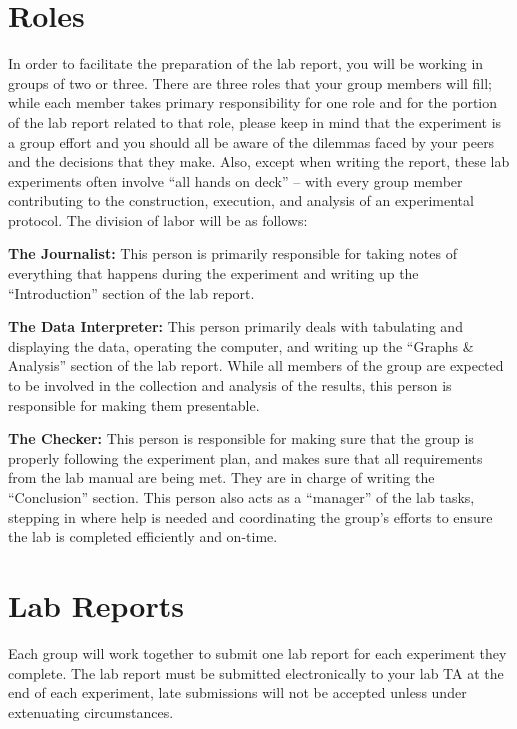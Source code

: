 \section*{Roles}
In order to facilitate the preparation of the lab report, you will be working in groups of two or three.  There are three roles that your group members will fill; while each member takes primary responsibility for one role and for the portion of the lab report related to that role, please keep in mind that the experiment is a group effort and you should all be aware of the dilemmas faced by your peers and the decisions that they make.  Also, except when writing the report, these lab experiments often involve ``all hands on deck'' -- with every group member contributing to the construction, execution, and analysis of an experimental protocol.  The division of labor will be as follows:
\begin{list}{}{\topsep=2pt \itemsep=1pt}
\item \textbf{The Journalist:} This person is primarily responsible for taking notes of everything that happens during the experiment and writing up the ``Introduction'' section of the lab report.
 
\item \textbf{The Data Interpreter:} This person primarily deals with tabulating and displaying the data, operating the computer, and writing up the ``Graphs \& Analysis'' section of the lab report. While all members of the group are expected to be involved in the collection and analysis of the results, this person is responsible for making them presentable.
 
\item \textbf{The Checker:} This person is responsible for making sure that the group is properly following the experiment plan, and makes sure that all requirements from the lab manual are being met. They are in charge of writing the ``Conclusion'' section. This person also acts as a ``manager'' of the lab tasks, stepping in where help is needed and coordinating the group's efforts to ensure the lab is completed efficiently and on-time.
\end{list}

\newpage

\section*{Lab Reports}
Each group will work together to submit one lab report for each experiment they complete.
The lab report must be submitted electronically to your lab TA at the end of each experiment, late submissions will not be accepted unless under extenuating circumstances.

